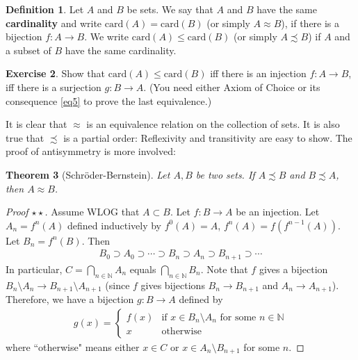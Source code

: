 \documentclass[12pt,b5paper,notitlepage]{article}
\theoremstyle{definition}
\newtheorem{df}{Definition}[section]
\newtheorem{exe}[df]{Exercise}
\theoremstyle{plain}
\newtheorem{thm}[df]{Theorem}
\newcommand{\Nbb}{\mathbb N}
\newcommand{\card}{\mathrm{card}}
\numberwithin{equation}{section}
\begin{document}
\begin{df}
Let $A$ and $B$ be sets. We say that $A$ and $B$ have the same \textbf{cardinality} \index{00@Cardinality $\card(A)$} and write $\card(A)=\card(B)$ (or simply $A\approx B$), if there is a bijection $f:A\rightarrow B$. We write $\card(A)\leq\card(B)$ (or simply $A\precsim B$) if $A$ and a subset of $B$ have the same cardinality. 
\end{df}



\begin{exe}\label{lb9}
Show that $\card(A)\leq\card(B)$ iff there is an injection $f:A\rightarrow B$, iff there is a surjection $g:B\rightarrow A$. (You need either Axiom of Choice or its consequence \eqref{eq5} to prove the last equivalence.)
\end{exe}

It is clear that $\approx$ is an equivalence relation on the collection of sets. It is also true that $\precsim$ is a partial order: Reflexivity and transitivity are easy to show. The proof of antisymmetry is more involved:



\begin{thm}[Schr\"oder-Bernstein]\label{lb8}
Let $A,B$ be two sets. If $A\precsim B$ and $B\precsim A$, then $A\approx B$.
\end{thm}

\begin{proof}[Proof $\star\star$]
Assume WLOG that $A\subset B$. Let $f:B\rightarrow A$ be an injection. Let $A_n=f^n(A)$ defined inductively by $f^0(A)=A$, $f^n(A)=f(f^{n-1}(A))$. Let $B_n=f^n(B)$. Then
\begin{align*}
B_0\supset A_0\supset \cdots\supset B_n\supset A_n\supset B_{n+1}\supset\cdots
\end{align*}
In particular, $C=\bigcap_{n\in\Nbb}A_n$ equals $\bigcap_{n\in\Nbb}B_n$. Note that $f$ gives a bijection $B_n\setminus A_n\rightarrow B_{n+1}\setminus A_{n+1}$ (since $f$ gives bijections $B_n\rightarrow B_{n+1}$ and $A_n\rightarrow A_{n+1}$). Therefore, we have a bijection $g:B\rightarrow A$ defined by
\begin{gather*}
g(x)=\left\{
{\begin{array}{ll}
f(x)&\text{if $x\in B_n\setminus A_n$ for some $n\in\Nbb$}\\[0.5ex]
x&\text{otherwise}
\end{array}}
\right.
\end{gather*}
where ``otherwise" means either $x\in C$ or $x\in A_n\setminus B_{n+1}$ for some $n$.
\end{proof}
\end{document}
